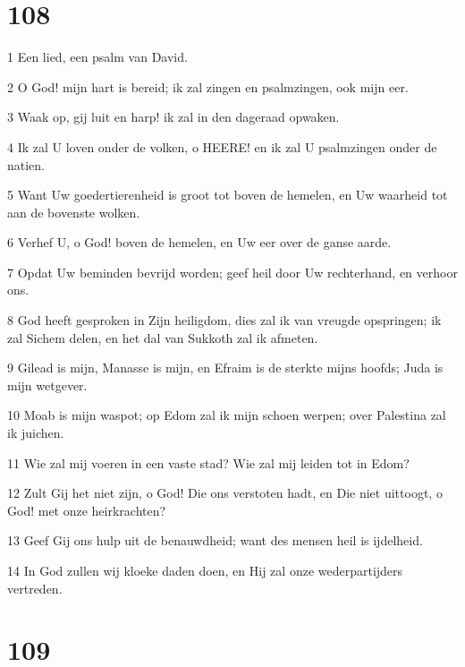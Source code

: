 \chapter{108}

\par 1 Een lied, een psalm van David.
\par 2 O God! mijn hart is bereid; ik zal zingen en psalmzingen, ook mijn eer.
\par 3 Waak op, gij luit en harp! ik zal in den dageraad opwaken.
\par 4 Ik zal U loven onder de volken, o HEERE! en ik zal U psalmzingen onder de natien.
\par 5 Want Uw goedertierenheid is groot tot boven de hemelen, en Uw waarheid tot aan de bovenste wolken.
\par 6 Verhef U, o God! boven de hemelen, en Uw eer over de ganse aarde.
\par 7 Opdat Uw beminden bevrijd worden; geef heil door Uw rechterhand, en verhoor ons.
\par 8 God heeft gesproken in Zijn heiligdom, dies zal ik van vreugde opspringen; ik zal Sichem delen, en het dal van Sukkoth zal ik afmeten.
\par 9 Gilead is mijn, Manasse is mijn, en Efraim is de sterkte mijns hoofds; Juda is mijn wetgever.
\par 10 Moab is mijn waspot; op Edom zal ik mijn schoen werpen; over Palestina zal ik juichen.
\par 11 Wie zal mij voeren in een vaste stad? Wie zal mij leiden tot in Edom?
\par 12 Zult Gij het niet zijn, o God! Die ons verstoten hadt, en Die niet uittoogt, o God! met onze heirkrachten?
\par 13 Geef Gij ons hulp uit de benauwdheid; want des mensen heil is ijdelheid.
\par 14 In God zullen wij kloeke daden doen, en Hij zal onze wederpartijders vertreden.

\chapter{109}

